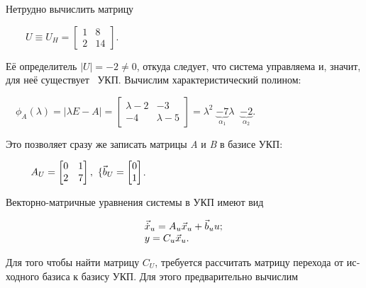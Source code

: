 \documentclass[a4paper]{article}
\newcommand\normalsubformula[1]{\text{\mathversion{normal}$#1$}}
\begin{document}
{\begin{russian}\sffamily
Нетрудно вычислить матрицу 
\end{russian}}

{\begin{russian}\sffamily
\ \ \ \  $U\equiv U_H=\left[\begin{matrix}1&8\\2&14\end{matrix}\right]$.
\end{russian}}

{\begin{russian}\sffamily
Её определитель  $|U|=-2\neq 0$, откуда следует, что система управляема и, значит, для неё существует \ УКП. Вычислим
характеристический полином:
\end{russian}}

{\begin{russian}\sffamily
\ \ 
$ϕ_A\left(λ\right)=|\mathit{λE}-A|=\left[\begin{matrix}λ-2&-3\\-4&λ-5\end{matrix}\right]=λ^2\;\underbrace{-7}_{α_1}λ\;\;\underbrace{-2}_{α_2}$.
\end{russian}}

{\begin{russian}\sffamily
Это позволяет сразу же записать матрицы \textit{A} и\textit{ B} в базисе УКП:
\end{russian}}

{\begin{russian}\sffamily
\ \ \ \ \   $A_U=\left[\begin{matrix}0&1\\2&7\end{matrix}\right],\text{      \{}\vec{\normalsubformula
b}_U=\left[\begin{matrix}0\\1\end{matrix}\right]$.
\end{russian}}


\bigskip

{\begin{russian}\sffamily
Векторно-матричные уравнения системы в УКП имеют вид
\end{russian}}

\begin{equation*}
\begin{matrix}\vec{\dot x}_u=A_u\vec x_u+\vec b_uu;\hfill\null \\y=C_u\vec x_u.\hfill\null \end{matrix}\hfill 
\end{equation*}
{\begin{russian}\sffamily
Для того чтобы найти матрицу  $C_U$, требуется рассчитать матрицу перехода от исходного базиса к базису УКП. Для этого
предварительно вычислим
\end{russian}}
\end{document}
